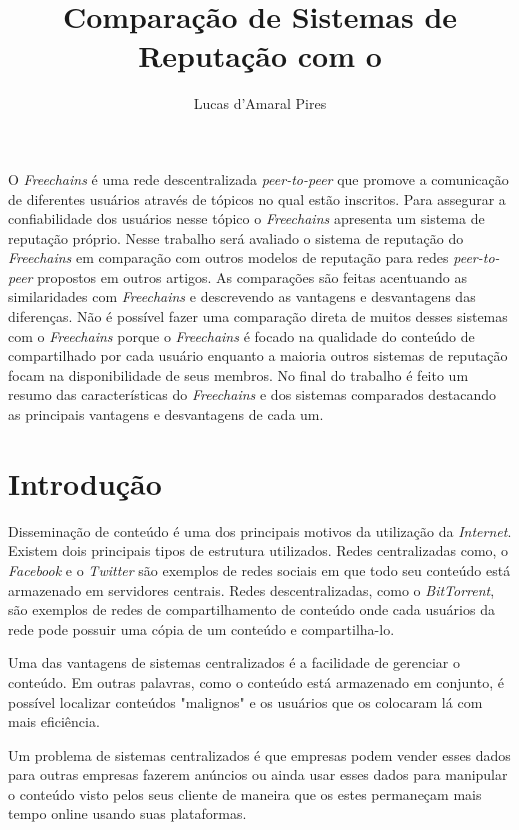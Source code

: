\documentclass[12pt]{article}
\title{Comparação de Sistemas de Reputação com o \FC}
\author{Lucas d'Amaral Pires\inst{1}}
\newcommand{\FC} {\emph{Freechains}\xspace}
\newcommand{\PtoP} {\emph{peer-to-peer}\xspace}
\begin{document}
 

\maketitle


\begin{resumo} 

O \FC é uma rede descentralizada \PtoP que promove a comunicação de diferentes usuários através de tópicos no qual estão inscritos. Para assegurar a confiabilidade dos usuários nesse tópico o \FC apresenta um sistema de reputação próprio. Nesse trabalho será avaliado o sistema de reputação do \FC em comparação com outros modelos de reputação para redes \PtoP propostos em outros artigos. As comparações são feitas acentuando as similaridades com \FC e descrevendo as vantagens e desvantagens das diferenças. Não é possível fazer uma comparação direta de muitos desses sistemas com o \FC porque o \FC é focado na qualidade do conteúdo de compartilhado por cada usuário enquanto a maioria outros sistemas de reputação focam na disponibilidade de seus membros. No final do trabalho é feito um resumo das características do \FC e dos sistemas comparados destacando as principais vantagens e desvantagens de cada um.
  
\end{resumo}


\section{Introdução} \label{sec:intro}

Disseminação de conteúdo é uma dos principais motivos da utilização da \emph{Internet}. Existem dois principais tipos de estrutura utilizados. Redes centralizadas como, o \emph{Facebook} e o \emph{Twitter} são exemplos de redes sociais em que todo seu conteúdo está armazenado em servidores centrais. Redes descentralizadas, como o \emph{BitTorrent}, são exemplos de redes de compartilhamento de conteúdo onde cada usuários da rede pode possuir uma cópia de um conteúdo e compartilha-lo. 

Uma das vantagens de sistemas centralizados é a facilidade de gerenciar o conteúdo. Em outras palavras, como o conteúdo está armazenado em conjunto, é possível localizar conteúdos "malignos" e os usuários que os colocaram lá com mais eficiência.

Um problema de sistemas centralizados é que empresas podem vender esses dados para outras empresas fazerem anúncios ou ainda usar esses dados para manipular o conteúdo visto pelos seus cliente de maneira que os estes permaneçam mais tempo online usando suas plataformas.
\end{document}
